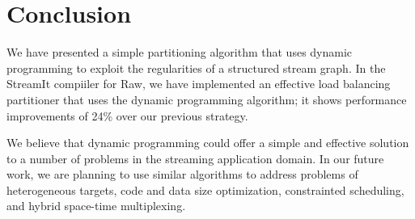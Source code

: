 \section{Conclusion}

We have presented a simple partitioning algorithm that uses dynamic
programming to exploit the regularities of a structured stream graph.
In the StreamIt compiiler for Raw, we have implemented an effective
load balancing partitioner that uses the dynamic programming
algorithm; it shows performance improvements of 24\% over our previous
strategy.  

We believe that dynamic programming could offer a simple and effective
solution to a number of problems in the streaming application domain.
In our future work, we are planning to use similar algorithms to
address problems of heterogeneous targets, code and data size
optimization, constrainted scheduling, and hybrid space-time
multiplexing.
